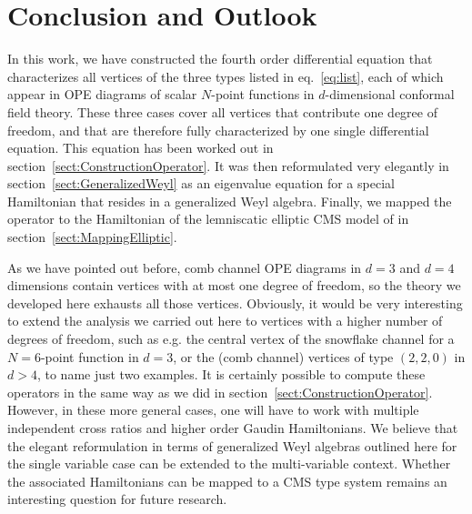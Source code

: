\documentclass{article}
\begin{document}
\section{Conclusion and Outlook}

In this work, we have constructed the fourth order differential equation that 
characterizes all vertices of the three types listed in eq.\ \eqref{eq:list}, each of which appear in OPE diagrams of scalar $N$-point functions in $d$-dimensional conformal 
field theory. These three cases cover all vertices that
contribute one degree of freedom, and that are therefore fully characterized 
by one single differential equation. This equation has been worked out in 
section~\ref{sect:ConstructionOperator}. It was then reformulated very elegantly in section~\ref{sect:GeneralizedWeyl} as an 
eigenvalue equation for a special Hamiltonian that resides in a 
generalized Weyl algebra. Finally, we mapped the operator to the Hamiltonian 
of the lemniscatic elliptic CMS model of \cite{etingof2011107} in section~\ref{sect:MappingElliptic}.  

As we have pointed out before, comb channel OPE diagrams in $d=3$ and $d=4$ 
dimensions contain vertices with at most one degree of freedom, so the 
theory we developed here exhausts all those vertices. Obviously, it would be 
very interesting to extend the analysis we carried out here to vertices with 
a higher number of degrees of freedom, such as e.g. the central vertex of 
the snowflake channel for a $N=6$-point function in $d=3$, or the (comb 
channel) vertices of type $(2,2,0)$ in $d > 4$, to name just two examples. 
It is certainly possible to compute these operators in the same way as we 
did in section~\ref{sect:ConstructionOperator}. However, in these more general cases, one will have to work with multiple independent cross ratios and higher order Gaudin Hamiltonians. 
We believe that the elegant reformulation in terms of generalized Weyl 
algebras outlined here for the single variable case can be extended 
to the multi-variable context. Whether the associated Hamiltonians can be 
mapped to a CMS type system remains an interesting question for future 
research. 
\end{document}

